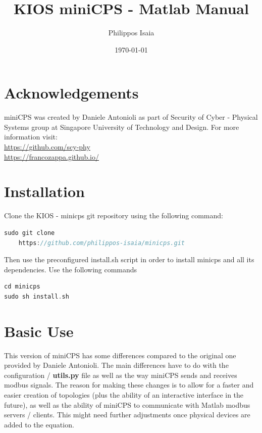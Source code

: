 \documentclass[book,a4paper,12pt,oneside]{memoir}
\begin{document}
\openany
\title{KIOS miniCPS - Matlab Manual}
\author{Philippos Isaia}
\date{\today}
\maketitle
\thispagestyle{empty}
\frontmatter
\tableofcontents
\chapter{Acknowledgements}
\label{cha:ack}

miniCPS was created by Daniele Antonioli as part of Security of Cyber - Physical Systems group at Singapore University of Technology and Design.
For more information visit: \\
\url{https://github.com/scy-phy} \\
\url{https://francozappa.github.io/}

\mainmatter
\chapter{Installation}
\label{cha:install}
Clone the KIOS - minicps git repository using the following command:
 
\begin{lstlisting}[backgroundcolor = \color{ultralightgray}, language = C, xleftmargin = 0.1cm, framexleftmargin = 0.3em, showstringspaces=false]
sudo git clone
    https://github.com/philippos-isaia/minicps.git
\end{lstlisting}

Then use the preconfigured install.sh script in order to install minicps and all its dependencies.  Use the following commands

\begin{lstlisting}[backgroundcolor = \color{ultralightgray}, language = C, xleftmargin = 0.1cm, framexleftmargin = 0.3em, showstringspaces=false]
cd minicps
sudo sh install.sh
\end{lstlisting}

\chapter{Basic Use}
\label{cha:basicuse}

This version of miniCPS has some differences compared to the original one provided by Daniele Antonioli.  The main differences have to do with the configuration / \textbf{utils.py} file as well as the way miniCPS sends and receives modbus signals.  The reason for making these changes is to allow for a faster and easier creation of topologies (plus the ability of an interactive interface in the future), as well as the ability of miniCPS to communicate with Matlab modbus servers / clients.  This might need further adjustments once physical devices are added to the equation.
\end{document}
